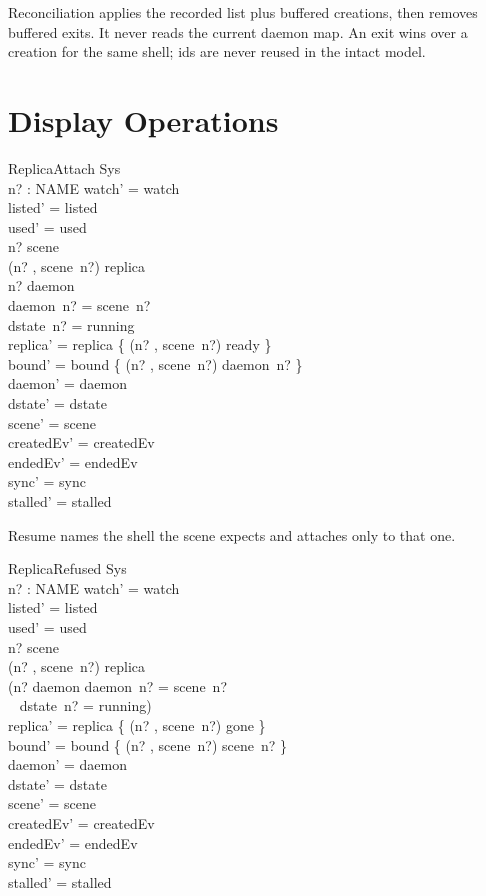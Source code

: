 \documentclass[a4paper,10pt,fleqn]{article}
\begin{document}
Reconciliation applies the recorded list plus buffered creations, then
removes buffered exits. It never reads the current daemon map. An exit wins
over a creation for the same shell; ids are never reused in the intact model.

\section{Display Operations}

\begin{schema}{ReplicaAttach}
  \Delta Sys \\
  n? : NAME
\where
  watch' = watch \\
  listed' = listed \\
  used' = used \\
  n? \in \dom scene \\
  (n? , scene~n?) \notin \dom replica \\
  n? \in \dom daemon \\
  daemon~n? = scene~n? \\
  dstate~n? = running \\
  replica' = replica \cup \{ (n? , scene~n?) \mapsto ready \} \\
  bound' = bound \cup \{ (n? , scene~n?) \mapsto daemon~n? \} \\
  daemon' = daemon \\
  dstate' = dstate \\
  scene' = scene \\
  createdEv' = createdEv \\
  endedEv' = endedEv \\
  sync' = sync \\
  stalled' = stalled
\end{schema}

Resume names the shell the scene expects and attaches only to that one.

\begin{schema}{ReplicaRefused}
  \Delta Sys \\
  n? : NAME
\where
  watch' = watch \\
  listed' = listed \\
  used' = used \\
  n? \in \dom scene \\
  (n? , scene~n?) \notin \dom replica \\
  \lnot (n? \in \dom daemon \land daemon~n? = scene~n? \\
    \quad~ \land dstate~n? = running) \\
  replica' = replica \cup \{ (n? , scene~n?) \mapsto gone \} \\
  bound' = bound \cup \{ (n? , scene~n?) \mapsto scene~n? \} \\
  daemon' = daemon \\
  dstate' = dstate \\
  scene' = scene \\
  createdEv' = createdEv \\
  endedEv' = endedEv \\
  sync' = sync \\
  stalled' = stalled
\end{schema}
\end{document}
